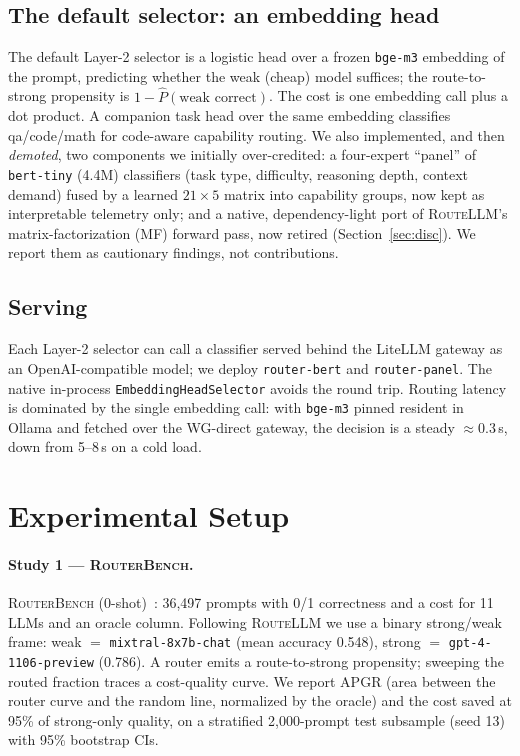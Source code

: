 \documentclass[11pt]{article}
\newcommand{\rb}{\textsc{RouterBench}}
\newcommand{\rl}{\textsc{RouteLLM}}
\newcommand{\code}[1]{\texttt{\small #1}}
\begin{document}
\subsection{The default selector: an embedding head}
The default Layer-2 selector is a logistic head over a frozen \code{bge-m3} embedding of
the prompt, predicting whether the weak (cheap) model suffices; the route-to-strong
propensity is $1-\hat P(\text{weak correct})$. The cost is one embedding call plus a dot
product. A companion task head over the same embedding classifies qa/code/math for
code-aware capability routing. We also implemented, and then \emph{demoted}, two
components we initially over-credited: a four-expert ``panel'' of \code{bert-tiny} (4.4M)
classifiers (task type, difficulty, reasoning depth, context demand) fused by a learned
$21\times5$ matrix into capability groups, now kept as interpretable telemetry only; and
a native, dependency-light port of \rl{}'s matrix-factorization (MF) forward pass, now
retired (Section~\ref{sec:disc}). We report them as cautionary findings, not
contributions.

\subsection{Serving}
Each Layer-2 selector can call a classifier served behind the LiteLLM gateway as an
OpenAI-compatible model; we deploy \code{router-bert} and \code{router-panel}. The native
in-process \code{EmbeddingHeadSelector} avoids the round trip. Routing latency is
dominated by the single embedding call: with \code{bge-m3} pinned resident in Ollama and
fetched over the WG-direct gateway, the decision is a steady $\approx$0.3\,s, down from
5--8\,s on a cold load.

\section{Experimental Setup}
\paragraph{Study 1 --- \rb{}.} \rb{} (0-shot)~\citep{routerbench}: 36{,}497 prompts with
0/1 correctness and a cost for 11 LLMs and an oracle column. Following \rl{} we use a
binary strong/weak frame: weak $=$ \code{mixtral-8x7b-chat} (mean accuracy 0.548), strong
$=$ \code{gpt-4-1106-preview} (0.786). A router emits a route-to-strong propensity;
sweeping the routed fraction traces a cost-quality curve. We report APGR (area between the
router curve and the random line, normalized by the oracle) and the cost saved at 95\% of
strong-only quality, on a stratified 2{,}000-prompt test subsample (seed 13) with 95\%
bootstrap CIs.
\end{document}
